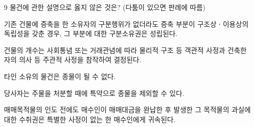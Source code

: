 \begin{question}{9}
물건에 관한 설명으로 옳지 않은 것은? (다툼이 있으면 판례에 따름)
\begin{choices}
  \item 기존 건물에 증축을 한 소유자의 구분행위가 없더라도 증축 부분이 구조상ㆍ이용상의 독립성을 갖춘 경우, 그 부분에 대한 구분소유권은 성립된다.
  \item 건물의 개수는 사회통념 또는 거래관념에 따라 물리적 구조 등 객관적 사정과 건축한 자의 의사 등 주관적 사정을 참작하여 결정된다.
  \item 타인 소유의 물건은 종물이 될 수 없다.
  \item 당사자는 주물을 처분할 때에 특약으로 종물을 제외할 수 있다.
  \item 매매목적물의 인도 전에도 매수인이 매매대금을 완납한 후 발생한 그 목적물의 과실에 대한 수취권은 특별한 사정이 없는 한 매수인에게 귀속된다.
\end{choices}
\end{question}
